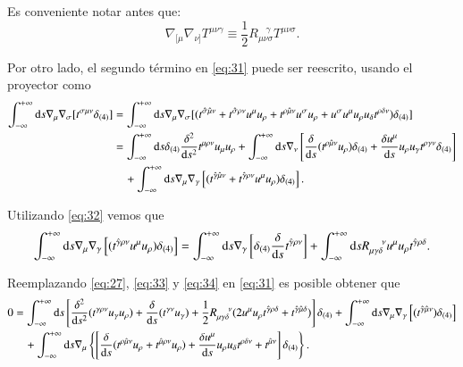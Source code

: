 Es conveniente notar antes que:
\begin{equation}
\label{eq:32}
\nabla_{[\mu} \nabla_{\nu]} T^{\mu \nu \gamma} \equiv \frac{1}{2} R_{\mu \nu \sigma}^{\ \ \ \ \gamma} T^{\mu \nu \sigma}.
\end{equation}

Por otro lado, el segundo término en \eqref{eq:31} puede ser reescrito, usando el proyector como
\begin{align}
\nonumber
\int_{-\infty}^{+\infty} \mathrm{d}s \nabla_{\mu} \nabla_{\sigma} [ t^{\sigma \mu \nu} \delta_{(4)} ] &= 
\int_{-\infty}^{+\infty} \mathrm{d}s \nabla_{\mu} \nabla_{\sigma} [ ( t^{\hat{\sigma} \hat{\mu} \nu} + t^{\hat{\sigma} \rho \nu} u^{\mu} u_{\rho} + t^{\rho \hat{\mu} \nu} u^{\sigma} u_{\rho} + u^{\sigma} u^{\mu} u_{\rho} u_{\delta} t^{\rho \delta \nu} ) \delta_{(4)} ] \\ \nonumber
&= \int_{-\infty}^{+\infty} \mathrm{d}s \delta_{(4)} \frac{\delta^2}{\mathrm{d}s^2} t^{\mu \rho \nu} u_{\mu} u_{\rho} + \int_{-\infty}^{+\infty} \mathrm{d}s \nabla_{\nu} \left[ \frac{\delta }{\mathrm{d}s} (t^{\rho \hat{\mu} \nu} u_{\rho}) \delta_{(4)} + \frac{\delta u^{\mu}}{\mathrm{d}s} u_{\rho} u_{\gamma}  t^{\rho \gamma \nu} \delta_{(4)} \right] \\ 
\label{eq:33}
& \quad + \int_{-\infty}^{+\infty} \mathrm{d}s \nabla_{\mu} \nabla_{\gamma} \left[ ( t^{\hat{\gamma} \hat{\mu} \nu}  + t^{\hat{\gamma} \rho \nu} u^{\mu} u_{\rho}) \delta_{(4)} \right].
\end{align}

Utilizando \eqref{eq:32} vemos que
\begin{equation}
\label{eq:34}
\int_{-\infty}^{+\infty} \mathrm{d}s \nabla_{\mu} \nabla_{\gamma} \left[ (t^{\hat{\gamma} \rho \nu} u^{\mu} u_{\rho}) \delta_{(4)} \right] = \int_{-\infty}^{+\infty} \mathrm{d}s \nabla_{\gamma} \left[ \delta_{(4)} \frac{\delta }{\mathrm{d}s} t^{\hat{\gamma} \rho \nu} \right] + \int_{-\infty}^{+\infty} \mathrm{d}s R^{\ \ \ \ \nu}_{\mu \gamma \delta} u^{\mu} u_{\rho} t^{\hat{\gamma} \rho \delta}.
\end{equation}

Reemplazando \eqref{eq:27}, \eqref{eq:33} y \eqref{eq:34} en \eqref{eq:31} es posible obtener que
\begin{align}
\nonumber
0 &= \int_{-\infty}^{+\infty} \mathrm{d}s \left[ \frac{\delta^2}{\mathrm{d}s^2} (t^{\gamma \rho \nu} u_{\gamma}u_{\rho}) + \frac{\delta }{\mathrm{d}s} (t^{\gamma \nu} u_{\gamma}) + \frac{1}{2} R^{\ \ \ \ \nu}_{\mu \gamma \delta} (2 u^{\mu} u_{\rho} t^{\hat{\gamma} \rho \delta} + t^{\hat{\gamma} \hat{\mu} \delta}) \right] \delta_{(4)} + \int_{-\infty}^{+\infty} \mathrm{d}s \nabla_{\mu} \nabla_{\gamma} \left[ ( t^{\hat{\gamma} \hat{\mu} \nu} )\delta_{(4)} \right] \\ 
\label{eq:35}
& \quad + \int_{-\infty}^{+\infty} \mathrm{d}s \nabla_{\mu} \left\{ \left[ \frac{\delta }{\mathrm{d}s} (t^{\rho \hat{\mu} \nu} u_{\rho} + t^{\hat{\mu} \rho \nu} u_{\rho}) + \frac{\delta u^{\mu}}{\mathrm{d}s} u_{\rho} u_{\delta} t^{\rho \delta \nu} + t^{\hat{\mu} \nu} \right] \delta_{(4)} \right\}.
\end{align}

